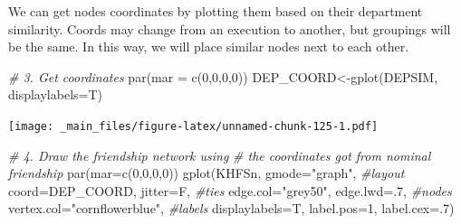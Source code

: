\documentclass[
  notitlepage,
  onecolumn,
  openany]{book}
\newenvironment{Shaded}{\begin{snugshade}}{\end{snugshade}}
\newcommand{\AttributeTok}[1]{\textcolor[rgb]{0.77,0.63,0.00}{#1}}
\newcommand{\CommentTok}[1]{\textcolor[rgb]{0.56,0.35,0.01}{\textit{#1}}}
\newcommand{\ConstantTok}[1]{\textcolor[rgb]{0.00,0.00,0.00}{#1}}
\newcommand{\DecValTok}[1]{\textcolor[rgb]{0.00,0.00,0.81}{#1}}
\newcommand{\FunctionTok}[1]{\textcolor[rgb]{0.00,0.00,0.00}{#1}}
\newcommand{\NormalTok}[1]{#1}
\newcommand{\OtherTok}[1]{\textcolor[rgb]{0.56,0.35,0.01}{#1}}
\newcommand{\SpecialCharTok}[1]{\textcolor[rgb]{0.00,0.00,0.00}{#1}}
\newcommand{\StringTok}[1]{\textcolor[rgb]{0.31,0.60,0.02}{#1}}
\begin{document}
\begin{Shaded}
\end{Shaded}

We can get nodes coordinates by plotting them based on their department similarity. Coords may change from an execution to another, but groupings will be the same. In this way, we will place similar nodes next to each other.

\begin{Shaded}
\begin{Highlighting}[]
\CommentTok{\# 3. Get coordinates}
\FunctionTok{par}\NormalTok{(}\AttributeTok{mar =} \FunctionTok{c}\NormalTok{(}\DecValTok{0}\NormalTok{,}\DecValTok{0}\NormalTok{,}\DecValTok{0}\NormalTok{,}\DecValTok{0}\NormalTok{))}
\NormalTok{DEP\_COORD}\OtherTok{\textless{}{-}}\FunctionTok{gplot}\NormalTok{(DEPSIM, }
                 \AttributeTok{displaylabels=}\NormalTok{T)}
\end{Highlighting}
\end{Shaded}

\texttt{[image: \_main\_files/figure-latex/unnamed-chunk-125-1.pdf]}

\begin{Shaded}
\begin{Highlighting}[]
\CommentTok{\# 4. Draw the friendship network using }
\CommentTok{\#    the coordinates got from nominal friendship}
\FunctionTok{par}\NormalTok{(}\AttributeTok{mar=}\FunctionTok{c}\NormalTok{(}\DecValTok{0}\NormalTok{,}\DecValTok{0}\NormalTok{,}\DecValTok{0}\NormalTok{,}\DecValTok{0}\NormalTok{))}
\FunctionTok{gplot}\NormalTok{(KHFSn,}
      \AttributeTok{gmode=}\StringTok{"graph"}\NormalTok{,}
      \CommentTok{\#layout}
      \AttributeTok{coord=}\NormalTok{DEP\_COORD,}
      \AttributeTok{jitter=}\NormalTok{F,}
      \CommentTok{\#ties}
      \AttributeTok{edge.col=}\StringTok{"grey50"}\NormalTok{,}
      \AttributeTok{edge.lwd=}\NormalTok{.}\DecValTok{7}\NormalTok{,}
      \CommentTok{\#nodes}
      \AttributeTok{vertex.col=}\StringTok{"cornflowerblue"}\NormalTok{,}
      \CommentTok{\#labels}
      \AttributeTok{displaylabels=}\NormalTok{T, }
      \AttributeTok{label.pos=}\DecValTok{1}\NormalTok{, }
      \AttributeTok{label.cex=}\NormalTok{.}\DecValTok{7}\NormalTok{)}
\end{Highlighting}
\end{Shaded}
\end{document}
